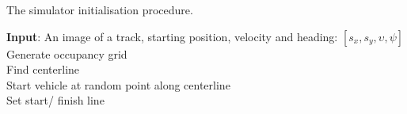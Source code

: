 \begin{algorithm}[htb!]
\caption{The simulator initialisation procedure.}\label{alg:simulator_start}
\nonl  \textbf{Input}: An image of a track, starting position, velocity and heading: $[s_{x}, s_{y}, {\upsilon}, \psi]$ \\
\vspace{0.2cm}
Generate occupancy grid \\
Find centerline \\
Start vehicle at random point along centerline \\
Set start/ finish line \\
\end{algorithm}

